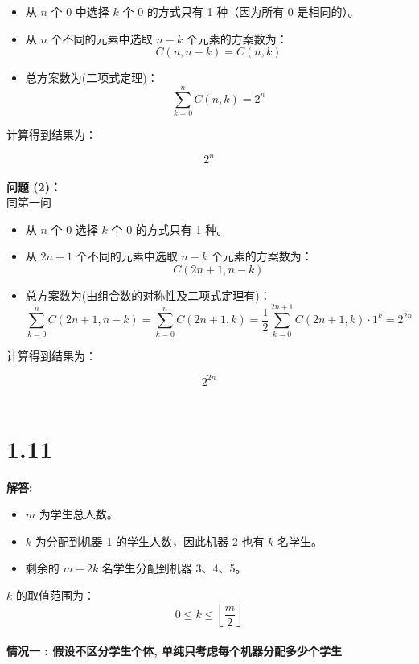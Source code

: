\documentclass{article}
\begin{document}
\begin{itemize}
    \item 从 $n$ 个 0 中选择 $k$ 个 0 的方式只有 1 种（因为所有 0 是相同的）。
    \item 从 $n$ 个不同的元素中选取 $n - k$ 个元素的方案数为：
    \[
    C(n, n - k) = C(n, k)
    \]
    \item 总方案数为(二项式定理)：
    \[
    \sum_{k=0}^{n} C(n, k) = 2^n 
    \]
\end{itemize}

计算得到结果为：

\[
\boxed{2^n}
\] \\

\textbf{问题 (2)：}\\
同第一问

\begin{itemize}
    \item 从 $n$ 个 0 选择 $k$ 个 0 的方式只有 1 种。
    \item 从 $2n + 1$ 个不同的元素中选取 $n - k$ 个元素的方案数为：
    \[
    C(2n + 1, n - k)
    \]
    \item 总方案数为(由组合数的对称性及二项式定理有)：
    \[
    \sum_{k=0}^{n} C(2n + 1, n - k) = \sum_{k=0}^{n} C(2n + 1, k) = \frac{1}{2}\sum_{k=0}^{2n+1} C(2n+1, k) \cdot 1^k = 2^{2n}
    \]
    
\end{itemize}

计算得到结果为：

\[
\boxed{2^{2n}}
\] \\

\section*{1.11}

\textbf{解答: }

\begin{itemize}
    \item $m$ 为学生总人数。
    \item $k$ 为分配到机器 1 的学生人数，因此机器 2 也有 $k$ 名学生。
    \item 剩余的 $m - 2k$ 名学生分配到机器 3、4、5。
\end{itemize}

\( k \) 的取值范围为：
\[
0 \leq k \leq \left\lfloor \frac{m}{2} \right\rfloor
\]
\\
\textbf{情况一 : 假设不区分学生个体, 单纯只考虑每个机器分配多少个学生}\\
\end{document}
